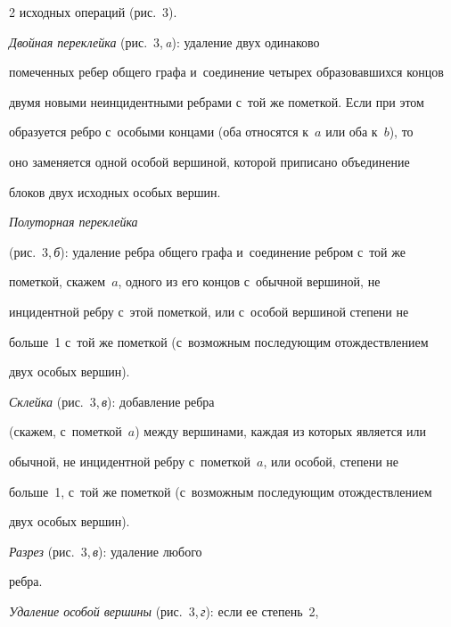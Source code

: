 \begin{multicols}{2}
исходных операций (рис.~3).


  





  


  \textit{Двойная переклейка} (рис.~3,\,\textit{a}): удаление двух одинаково 


помеченных ребер общего графа и~соединение четырех образовавшихся концов 


двумя новыми неинцидентными реб\-ра\-ми с~той же пометкой. Если при этом 


образуется ребро с~особыми концами (оба относятся к~$a$ или оба к~$b$), то 


оно заменяется одной особой вершиной, которой приписано объединение 


блоков двух исходных особых вершин. 





\textit{Полуторная переклейка}


(рис.~3,\,\textit{б}): удаление реб\-ра общего графа и~соединение ребром с~той же 


пометкой, скажем~$a$, одного из его концов с~обычной вершиной, не 


инцидентной ребру с~этой пометкой, или с~особой вершиной степени не 


больше~1 с~той же пометкой (с~возможным последующим отождествлением 


двух особых вершин). 





\textit{Склейка} (рис.~3,\,\textit{в}): добавление реб\-ра 


(скажем, с~пометкой~$a$) между вершинами, каждая из которых является или 


обычной, не инцидентной ребру с~пометкой~$a$, или особой, степени не 


больше~1, с~той же пометкой (с~возможным последующим отождествлением 


двух особых вершин). 





\textit{Разрез} (рис.~3,\,\textit{в}): удаление любого 


реб\-ра. 





\textit{Удаление особой вершины} (рис.~3,\,\textit{г}): если ее степень~2, 



\end{multicols}
